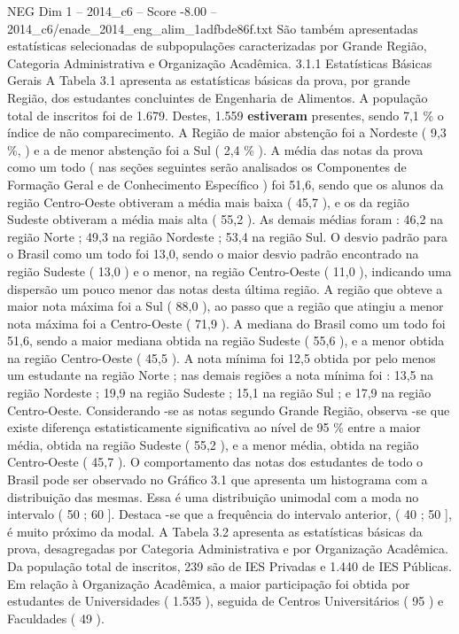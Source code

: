 \begin{textsample}{NEG Dim 1 – 2014\_c6 – Score -8.00 – 2014\_c6/enade\_2014\_eng\_alim\_1adfbde86f.txt}
São também apresentadas estatísticas selecionadas de subpopulações caracterizadas por Grande Região, Categoria Administrativa e Organização Acadêmica. 3.1.1 Estatísticas Básicas Gerais A Tabela 3.1 apresenta as estatísticas básicas da prova, por grande Região, dos estudantes concluintes de Engenharia de Alimentos.
A população total de inscritos foi de 1.679.
Destes, 1.559 \textbf{estiveram} presentes, sendo 7,1 \% o índice de não comparecimento.
A Região de maior abstenção foi a Nordeste ( 9,3 \%, ) e a de menor abstenção foi a Sul ( 2,4 \% ).
A média das notas da prova como um todo ( nas seções seguintes serão analisados os Componentes de Formação Geral e de Conhecimento Específico ) foi 51,6, sendo que os alunos da região Centro-Oeste obtiveram a média mais baixa ( 45,7 ), e os da região Sudeste obtiveram a média mais alta ( 55,2 ).
As demais médias foram : 46,2 na região Norte ; 49,3 na região Nordeste ; 53,4 na região Sul.
O desvio padrão para o Brasil como um todo foi 13,0, sendo o maior desvio padrão encontrado na região Sudeste ( 13,0 ) e o menor, na região Centro-Oeste ( 11,0 ), indicando uma dispersão um pouco menor das notas desta última região.
A região que obteve a maior nota máxima foi a Sul ( 88,0 ), ao passo que a região que atingiu a menor nota máxima foi a Centro-Oeste ( 71,9 ).
A mediana do Brasil como um todo foi 51,6, sendo a maior mediana obtida na região Sudeste ( 55,6 ), e a menor obtida na região Centro-Oeste ( 45,5 ).
A nota mínima foi 12,5 obtida por pelo menos um estudante na região Norte ; nas demais regiões a nota mínima foi : 13,5 na região Nordeste ; 19,9 na região Sudeste ; 15,1 na região Sul ; e 17,9 na região Centro-Oeste.
Considerando -se as notas segundo Grande Região, observa -se que existe diferença estatisticamente significativa ao nível de 95 \% entre a maior média, obtida na região Sudeste ( 55,2 ), e a menor média, obtida na região Centro-Oeste ( 45,7 ).
O comportamento das notas dos estudantes de todo o Brasil pode ser observado no Gráfico 3.1 que apresenta um histograma com a distribuição das mesmas.
Essa é uma distribuição unimodal com a moda no intervalo ( 50 ; 60 ].
Destaca -se que a frequência do intervalo anterior, ( 40 ; 50 ], é muito próximo da modal.
A Tabela 3.2 apresenta as estatísticas básicas da prova, desagregadas por Categoria Administrativa e por Organização Acadêmica.
Da população total de inscritos, 239 são de IES Privadas e 1.440 de IES Públicas.
Em relação à Organização Acadêmica, a maior participação foi obtida por estudantes de Universidades ( 1.535 ), seguida de Centros Universitários ( 95 ) e Faculdades ( 49 ).

\end{textsample}

